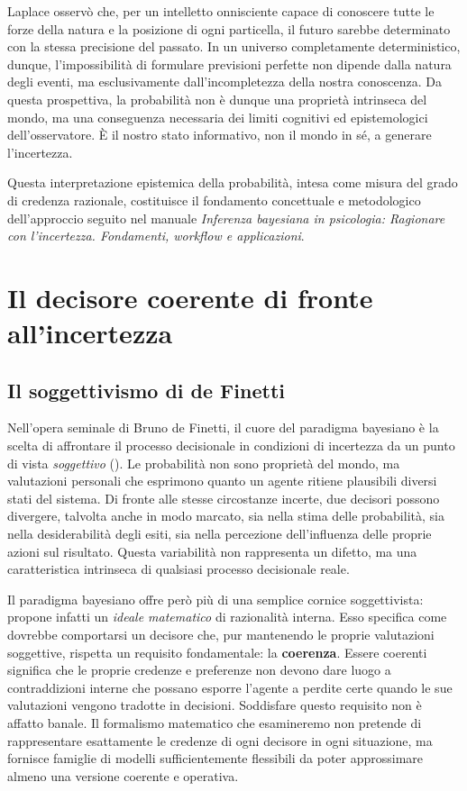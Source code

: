 \documentclass[
  letterpaper,
  DIV=11,
  numbers=noendperiod,
  oneside]{scrreprt}
\theoremstyle{definition}
\theoremstyle{plain}
\theoremstyle{definition}
\theoremstyle{remark}
\begin{document}
Laplace osservò che, per un intelletto onnisciente capace di conoscere
tutte le forze della natura e la posizione di ogni particella, il futuro
sarebbe determinato con la stessa precisione del passato. In un universo
completamente deterministico, dunque, l'impossibilità di formulare
previsioni perfette non dipende dalla natura degli eventi, ma
esclusivamente dall'incompletezza della nostra conoscenza. Da questa
prospettiva, la probabilità non è dunque una proprietà intrinseca del
mondo, ma una conseguenza necessaria dei limiti cognitivi ed
epistemologici dell'osservatore. È il nostro stato informativo, non il
mondo in sé, a generare l'incertezza.

Questa interpretazione epistemica della probabilità, intesa come misura
del grado di credenza razionale, costituisce il fondamento concettuale e
metodologico dell'approccio seguito nel manuale \emph{Inferenza
bayesiana in psicologia: Ragionare con l'incertezza. Fondamenti,
workflow e applicazioni}.

\section{Il decisore coerente di fronte
all'incertezza}\label{il-decisore-coerente-di-fronte-allincertezza}

\subsection{Il soggettivismo di de
Finetti}\label{il-soggettivismo-di-de-finetti}

Nell'opera seminale di Bruno de Finetti, il cuore del paradigma
bayesiano è la scelta di affrontare il processo decisionale in
condizioni di incertezza da un punto di vista \emph{soggettivo}
(). Le probabilità non sono
proprietà del mondo, ma valutazioni personali che esprimono quanto un
agente ritiene plausibili diversi stati del sistema. Di fronte alle
stesse circostanze incerte, due decisori possono divergere, talvolta
anche in modo marcato, sia nella stima delle probabilità, sia nella
desiderabilità degli esiti, sia nella percezione dell'influenza delle
proprie azioni sul risultato. Questa variabilità non rappresenta un
difetto, ma una caratteristica intrinseca di qualsiasi processo
decisionale reale.

Il paradigma bayesiano offre però più di una semplice cornice
soggettivista: propone infatti un \emph{ideale matematico} di
razionalità interna. Esso specifica come dovrebbe comportarsi un
decisore che, pur mantenendo le proprie valutazioni soggettive, rispetta
un requisito fondamentale: la \textbf{coerenza}. Essere coerenti
significa che le proprie credenze e preferenze non devono dare luogo a
contraddizioni interne che possano esporre l'agente a perdite certe
quando le sue valutazioni vengono tradotte in decisioni. Soddisfare
questo requisito non è affatto banale. Il formalismo matematico che
esamineremo non pretende di rappresentare esattamente le credenze di
ogni decisore in ogni situazione, ma fornisce famiglie di modelli
sufficientemente flessibili da poter approssimare almeno una versione
coerente e operativa.
\end{document}
